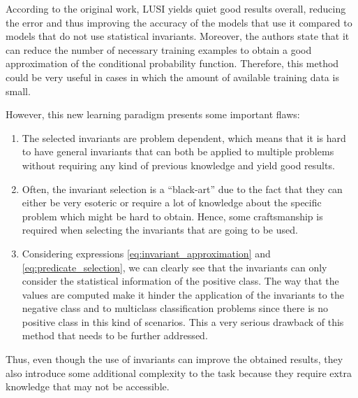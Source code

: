 According to the original work, LUSI yields quiet good results overall, reducing the error and thus improving
the accuracy of the models that use it compared to models that do not use statistical invariants. Moreover,
the authors state that it can reduce the number of necessary training examples to obtain a good approximation
of the conditional probability function. Therefore, this method could be very useful in cases in which the
amount of available training data is small.

However, this new learning paradigm presents some important flaws:

\begin{enumerate}
    \item The selected invariants are problem dependent, which means that it is hard to have general invariants
    that can both be applied to multiple problems without requiring any kind of previous knowledge
    and yield good results.
    \item Often, the invariant selection is a ``black-art'' due to the fact that they can either be
    very esoteric or require a lot of knowledge about the specific problem which might be hard
    to obtain. Hence, some craftsmanship is required when selecting the invariants that are going
    to be used.
    \item Considering expressions \eqref{eq:invariant_approximation} and \eqref{eq:predicate_selection}, we
    can clearly see that the invariants can only consider the statistical information of
    the positive class. The way that the values are computed make it hinder the application of the invariants
    to the negative class and to multiclass classification problems since there is no positive class in this kind
    of scenarios. This a very serious drawback of this method that needs to be further addressed.
\end{enumerate}

Thus, even though the use of invariants can improve the obtained results, they also introduce some additional
complexity to the task because they require extra knowledge that may not be accessible.
